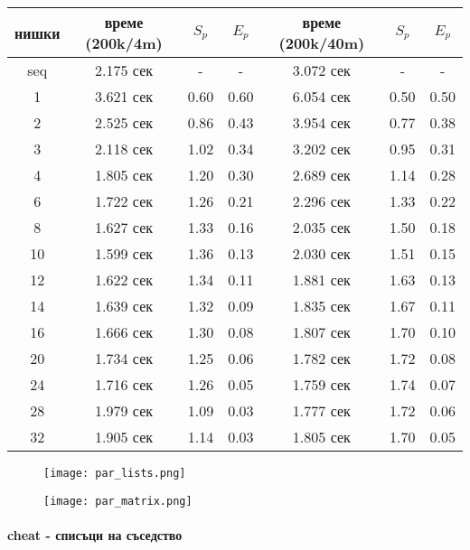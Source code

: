 \begin{center}
\begin{tabular}{ c | c c c | c c c | }
  нишки & време (200k/4m) & $S_p$ & $E_p$ & време (200k/40m) & $S_p$ & $E_p$ \\
  \hline
  seq & 2.175 сек & - & - & 3.072 сек & - & - \\
  1  & 3.621 сек & 0.60 & 0.60 & 6.054 сек & 0.50 &  0.50 \\
  2  & 2.525 сек & 0.86 & 0.43 & 3.954 сек & 0.77 &  0.38 \\
  3  & 2.118 сек & 1.02 & 0.34 & 3.202 сек & 0.95 &  0.31 \\
  4  & 1.805 сек & 1.20 & 0.30 & 2.689 сек & 1.14 &  0.28 \\
  6  & 1.722 сек & 1.26 & 0.21 & 2.296 сек & 1.33 &  0.22 \\
  8  & 1.627 сек & 1.33 & 0.16 & 2.035 сек & 1.50 &  0.18 \\
  10 & 1.599 сек & 1.36 & 0.13 & 2.030 сек & 1.51 &  0.15 \\
  12 & 1.622 сек & 1.34 & 0.11 & 1.881 сек & 1.63 &  0.13 \\
  14 & 1.639 сек & 1.32 & 0.09 & 1.835 сек & 1.67 &  0.11 \\
  16 & 1.666 сек & 1.30 & 0.08 & 1.807 сек & 1.70 &  0.10 \\
  20 & 1.734 сек & 1.25 & 0.06 & 1.782 сек & 1.72 &  0.08 \\
  24 & 1.716 сек & 1.26 & 0.05 & 1.759 сек & 1.74 &  0.07 \\
  28 & 1.979 сек & 1.09 & 0.03 & 1.777 сек & 1.72 &  0.06 \\
  32 & 1.905 сек & 1.14 & 0.03 & 1.805 сек & 1.70 &  0.05 \\
\end{tabular}
\end{center}

\begin{figure}[H]
  \centering
  \begin{minipage}{.45\textwidth}
    \centering
    \texttt{[image: par\_lists.png]}
  \end{minipage}
  \begin{minipage}{.45\textwidth}
    \centering
    \texttt{[image: par\_matrix.png]}
  \end{minipage}
\end{figure}

\paragraph*{cheat - списъци на съседство}

